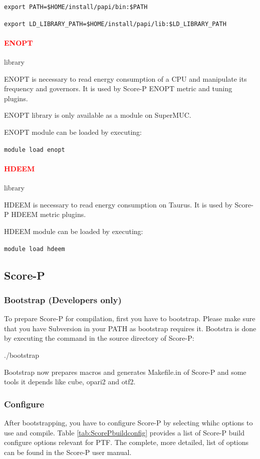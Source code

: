 \documentclass[11pt,a4paper, oneside]{book} %
\newcommand{\installloc}[1]{\$HOME/install/#1}
\begin{document}
\texttt{export PATH=\installloc{papi/bin}:\$PATH}

\texttt{export LD\_LIBRARY\_PATH=\installloc{papi/lib}:\$LD\_LIBRARY\_PATH}

\paragraph{\textcolor{red}{ENOPT}} library

ENOPT is necessary to read energy consumption of a CPU and manipulate its
frequency and governors. It is used by Score-P ENOPT metric and tuning plugins.

ENOPT library is only available as a module on SuperMUC.

ENOPT module can be loaded by executing:

\texttt{module load enopt}

\paragraph{\textcolor{red}{HDEEM}} library

HDEEM is necessary to read energy consumption on Taurus. It is used by Score-P
HDEEM metric plugins.

HDEEM module can be loaded by executing:

\texttt{module load hdeem}

\subsection{Score-P}

\subsubsection{Bootstrap (Developers only)}

To prepare Score-P for compilation, first you have to bootstrap. Please make
sure that you have Subversion in your PATH as bootstrap requires it. Bootstra is
done by executing the command in the source directory of Score-P:

./bootstrap

Bootstrap now prepares macros and generates Makefile.in of Score-P and some
tools it depends like cube, opari2 and otf2.

\subsubsection{Configure}
After bootstrapping, you have to configure Score-P by selecting whihc options to
use and compile. Table \ref{tab:ScorePbuildconfig} provides a list of Score-P
build configure options relevant for PTF. The complete, more detailed, list of
options can be found in the Score-P user manual.
\end{document}
